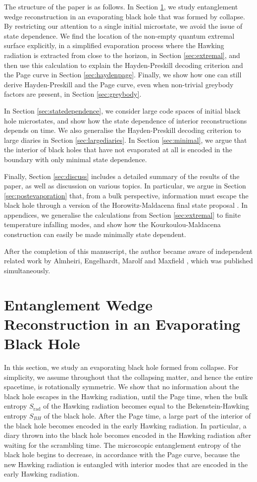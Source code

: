 \documentclass[12pt]{article}
\newcommand{\Srad}{S_\text{rad} }
\begin{document}
The structure of the paper is as follows. In Section \ref{sec:evaporation}, we study entanglement wedge reconstruction in an evaporating black hole that was formed by collapse. By restricting our attention to a single initial microstate, we avoid the issue of state dependence. We find the location of the non-empty quantum extremal surface explicitly, in a simplified evaporation process where the Hawking radiation is extracted from close to the horizon, in Section \ref{sec:extremal}, and then use this calculation to explain the Hayden-Preskill decoding criterion and the Page curve in Section \ref{sec:haydenpage}. Finally, we show how one can still derive Hayden-Preskill and the Page curve, even when non-trivial greybody factors are present, in Section \ref{sec:greybody}.

In Section \ref{sec:statedependence}, we consider large code spaces of initial black hole microstates, and show how the state dependence of interior reconstructions depends on time. We also generalise the Hayden-Preskill decoding criterion to large diaries in Section \ref{sec:largediaries}. In Section \ref{sec:minimal}, we argue that the interior of black holes that have not evaporated at all is encoded in the boundary with only minimal state dependence.

Finally, Section \ref{sec:discuss} includes a detailed summary of the results of the paper, as well as discussion on various topics. In particular, we argue in Section \ref{sec:postevaporation} that, from a bulk perspective, information must escape the black hole through a version of the Horowitz-Maldacena final state proposal \cite{horowitz2004black}. In appendices, we generalise the calculations from Section \ref{sec:extremal} to finite temperature infalling modes, and show how the Kourkoulou-Maldacena construction can easily be made minimally state dependent.

After the completion of this manuscript, the author became aware of independent related work by Almheiri, Engelhardt, Marolf and Maxfield \cite{almheiri2019entropy}, which was published simultaneously.

\section{Entanglement Wedge Reconstruction in an Evaporating Black Hole} \label{sec:evaporation}
In this section, we study an evaporating black hole formed from collapse. For simplicity, we assume throughout that the collapsing matter, and hence the entire spacetime, is rotationally symmetric. We show that no information about the black hole escapes in the Hawking radiation, until the Page time, when the bulk entropy $\Srad$ of the Hawking radiation becomes equal to the Bekenstein-Hawking entropy $S_{BH}$ of the black hole. After the Page time, a large part of the interior of the black hole becomes encoded in the early Hawking radiation. In particular, a diary thrown into the black hole becomes encoded in the Hawking radiation after waiting for the scrambling time. The microscopic entanglement entropy of the black hole begins to decrease, in accordance with the Page curve, because the new Hawking radiation is entangled with interior modes that are encoded in the early Hawking radiation.
\end{document}
